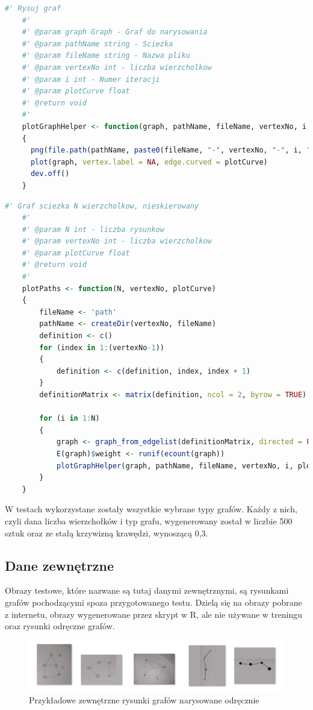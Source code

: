 \begin{lstlisting}[language=R,caption=Listing skryptu rysującego grafy,label={tests-generation-1}]
	#' Rysuj graf
	#'
	#' @param graph Graph - Graf do narysowania
	#' @param pathName string - Sciezka
	#' @param fileName string - Nazwa pliku
	#' @param vertexNo int - liczba wierzcholkow
	#' @param i int - Numer iteracji
	#' @param plotCurve float
	#' @return void
	#'
	plotGraphHelper <- function(graph, pathName, fileName, vertexNo, i, plotCurve)
	{
	  png(file.path(pathName, paste0(fileName, "-", vertexNo, "-", i, ".png")), width = 800, height = 600)
	  plot(graph, vertex.label = NA, edge.curved = plotCurve)
	  dev.off()
	}
\end{lstlisting}

\begin{lstlisting}[language=R,caption=Listing funkcji tworzącej ścieżkę,label={tests-generation-2}]
	#' Graf sciezka N wierzcholkow, nieskierowany
	#'
	#' @param N int - liczba rysunkow
	#' @param vertexNo int - liczba wierzcholkow
	#' @param plotCurve float
	#' @return void
	#'
	plotPaths <- function(N, vertexNo, plotCurve)
	{
		fileName <- 'path'
		pathName <- createDir(vertexNo, fileName)
		definition <- c()
		for (index in 1:(vertexNo-1))
		{
			definition <- c(definition, index, index + 1)
		}
		definitionMatrix <- matrix(definition, ncol = 2, byrow = TRUE)
		
		for (i in 1:N)
		{
			graph <- graph_from_edgelist(definitionMatrix, directed = FALSE)
			E(graph)$weight <- runif(ecount(graph))
			plotGraphHelper(graph, pathName, fileName, vertexNo, i, plotCurve)
		}
	}
\end{lstlisting}

W testach wykorzystane zostały wszystkie wybrane typy grafów.
Każdy z nich, czyli dana liczba wierzchołków i typ grafu, wygenerowany został w liczbie 500 sztuk
oraz ze stałą krzywizną krawędzi, wynoszącą 0,3. %

\subsection{Dane zewnętrzne}
Obrazy testowe, które nazwane są tutaj danymi zewnętrznymi, są rysunkami grafów pochodzącymi spoza przygotowanego testu.
Dzielą się na obrazy pobrane z internetu, obrazy wygenerowane przez skrypt w R, ale nie używane w treningu
oraz rysunki odręczne grafów.

\begin{figure}[ht]
	\centering
	\includegraphics[width=15.5cm]{partials/images/graphs_tests-drawn.png}
	\caption{Przykładowe zewnętrzne rysunki grafów narysowane odręcznie}
	\label{Fig:tests-outside-1}
\end{figure}
\FloatBarrier

